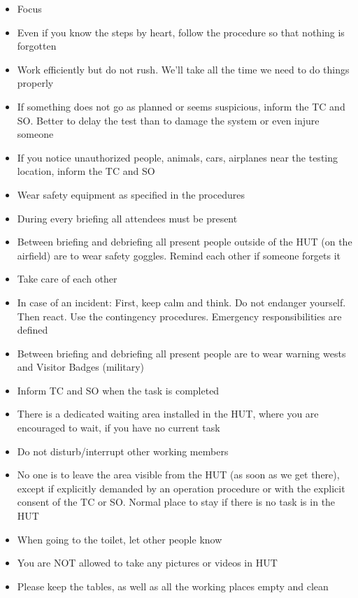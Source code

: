 \documentclass{article}
\begin{document}
\begin{itemize}
    \item Focus
    \item Even if you know the steps by heart, follow the procedure so that nothing is forgotten 
    \item Work efficiently but do not rush. We’ll take all the time we need to do things properly
    \item If something does not go as planned or seems suspicious, inform the TC and SO. Better to delay the test than to damage the system or even injure someone
    \item If you notice unauthorized people, animals, cars, airplanes near the testing location, inform the TC and SO
    \item Wear safety equipment as specified in the procedures
    \item During every briefing all attendees must be present
    \item Between briefing and debriefing all present people outside of the HUT (on the airfield) are to wear safety goggles. Remind each other if someone forgets it
    \item Take care of each other
    \item In case of an incident: First, keep calm and think. Do not endanger yourself. Then react. Use the contingency procedures. Emergency responsibilities are defined
    \item Between briefing and debriefing all present people are to wear warning wests and Visitor Badges (military)
    \item Inform TC and SO when the task is completed
    \item There is a dedicated waiting area installed in the HUT, where you are encouraged to wait, if you have no current task
    \item Do not disturb/interrupt other working members
    \item No one is to leave the area visible from the HUT (as soon as we get there), except if explicitly demanded by an operation procedure or with the explicit consent of the TC or SO. Normal place to stay if there is no task is in the HUT
    \item When going to the toilet, let other people know
    \item You are NOT allowed to take any pictures or videos in HUT
    \item Please keep the tables, as well as all the working places empty and clean
\end{itemize}
\end{document}
